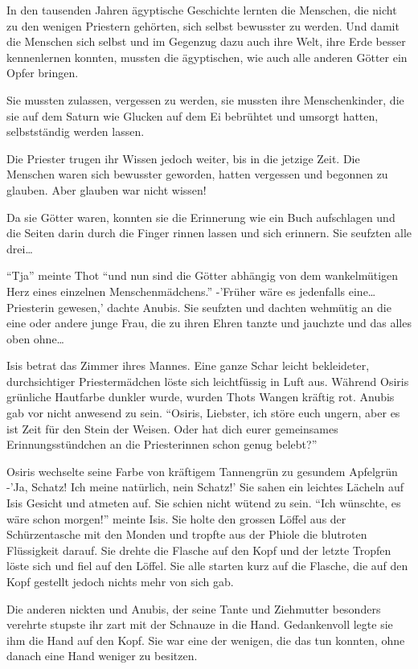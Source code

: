 \documentclass[11pt,titlepage,a5paper]{book}
\begin{document}
In den tausenden Jahren ägyptische Geschichte lernten die Menschen, die nicht zu den wenigen Priestern gehörten, sich selbst bewusster zu werden. Und damit die Menschen sich selbst und im Gegenzug dazu auch ihre Welt, ihre Erde besser kennenlernen konnten, mussten die ägyptischen, wie auch alle anderen Götter ein Opfer bringen.

Sie mussten zulassen, vergessen zu werden, sie mussten ihre Menschenkinder, die sie auf dem Saturn wie Glucken auf dem Ei bebrühtet und umsorgt hatten, selbstständig werden lassen.

Die Priester trugen ihr Wissen jedoch weiter, bis in die jetzige Zeit. Die Menschen waren sich bewusster geworden, hatten vergessen und begonnen zu glauben. Aber glauben war nicht wissen!

Da sie Götter waren, konnten sie die Erinnerung wie ein Buch aufschlagen und die Seiten darin durch die Finger rinnen lassen und sich erinnern. Sie seufzten alle drei\dots 

"`Tja"' meinte Thot "`und nun sind die Götter abhängig von dem wankelmütigen Herz eines einzelnen Menschenmädchens."' -'Früher wäre es jedenfalls eine\dots Priesterin gewesen,' dachte Anubis. Sie seufzten und dachten wehmütig an die eine oder andere junge Frau, die zu ihren Ehren tanzte und jauchzte und das alles oben ohne\dots

Isis betrat das Zimmer ihres Mannes. Eine ganze Schar leicht bekleideter, durchsichtiger Priestermädchen löste sich leichtfüssig in Luft aus. Während Osiris grünliche Hautfarbe dunkler wurde, wurden Thots Wangen kräftig rot. Anubis gab vor nicht anwesend zu sein. "`Osiris, Liebster, ich störe euch ungern, aber es ist Zeit für den Stein der Weisen. Oder hat dich eurer gemeinsames Erinnungsstündchen an die Priesterinnen schon genug belebt?"' 

Osiris wechselte seine Farbe von kräftigem Tannengrün zu gesundem Apfelgrün -'Ja, Schatz! Ich meine natürlich, nein Schatz!' Sie sahen ein leichtes Lächeln auf Isis Gesicht und atmeten auf. Sie schien nicht wütend zu sein. "`Ich wünschte, es wäre schon morgen!"' meinte Isis. Sie holte den grossen Löffel aus der Schürzentasche mit den Monden und tropfte aus der Phiole die blutroten Flüssigkeit darauf. Sie drehte die Flasche auf den Kopf und der letzte Tropfen löste sich und fiel auf den Löffel. Sie alle starten kurz auf die Flasche, die auf den Kopf gestellt jedoch nichts mehr von sich gab.

Die anderen nickten und Anubis, der seine Tante und Ziehmutter besonders verehrte stupste ihr zart mit der Schnauze in die Hand. Gedankenvoll legte sie ihm die Hand auf den Kopf. Sie war eine der wenigen, die das tun konnten, ohne danach eine Hand weniger zu besitzen.
\end{document}
